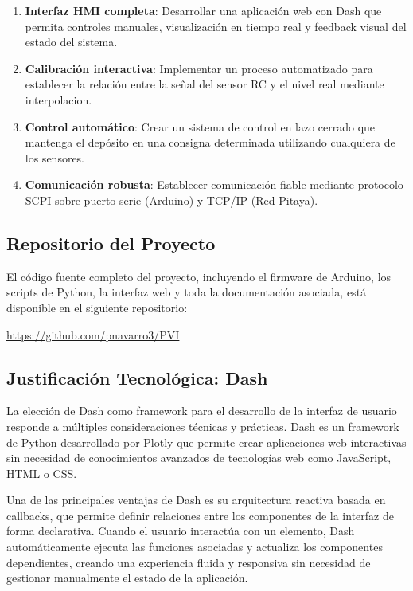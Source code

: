 \documentclass[12pt,a4paper]{article}
\begin{document}
\begin{enumerate}
    \item \textbf{Interfaz HMI completa}: Desarrollar una aplicación web con Dash que permita controles manuales, visualización en tiempo real y feedback visual del estado del sistema.
    
    \item \textbf{Calibración interactiva}: Implementar un proceso automatizado para establecer la relación entre la señal del sensor RC y el nivel real mediante interpolacion.
    
    \item \textbf{Control automático}: Crear un sistema de control en lazo cerrado que mantenga el depósito en una consigna determinada utilizando cualquiera de los sensores.
    
    \item \textbf{Comunicación robusta}: Establecer comunicación fiable mediante protocolo SCPI sobre puerto serie (Arduino) y TCP/IP (Red Pitaya).
\end{enumerate}

\subsection{Repositorio del Proyecto}

El código fuente completo del proyecto, incluyendo el firmware de Arduino, los scripts de Python, la interfaz web y toda la documentación asociada, está disponible en el siguiente repositorio:

\begin{center}
\url{https://github.com/pnavarro3/PVI}
\end{center}

\subsection{Justificación Tecnológica: Dash}

La elección de Dash como framework para el desarrollo de la interfaz de usuario responde a múltiples consideraciones técnicas y prácticas. Dash es un framework de Python desarrollado por Plotly que permite crear aplicaciones web interactivas sin necesidad de conocimientos avanzados de tecnologías web como JavaScript, HTML o CSS. 

Una de las principales ventajas de Dash es su arquitectura reactiva basada en callbacks, que permite definir relaciones entre los componentes de la interfaz de forma declarativa. Cuando el usuario interactúa con un elemento, Dash automáticamente ejecuta las funciones asociadas y actualiza los componentes dependientes, creando una experiencia fluida y responsiva sin necesidad de gestionar manualmente el estado de la aplicación.
\end{document}
